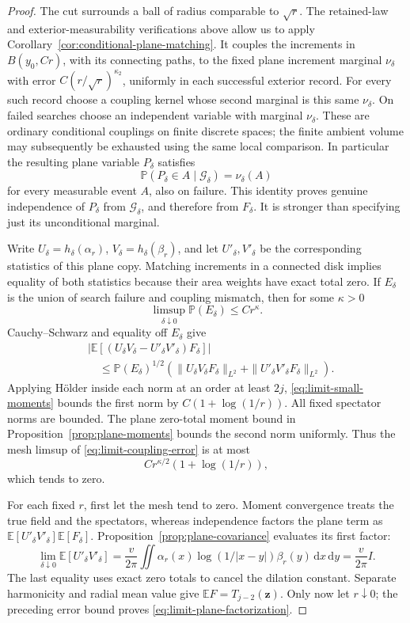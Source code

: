 \documentclass[11pt]{article}
\theoremstyle{definition}
\theoremstyle{remark}
\numberwithin{equation}{section}
\begin{document}
\begin{proof}
The cut surrounds a ball of radius comparable to \(\sqrt r\).
The retained-law and exterior-measurability verifications above allow
us to apply Corollary~\ref{cor:conditional-plane-matching}.  It couples
the increments
in \(B(y_0,Cr)\), with its connecting paths, to the fixed plane
increment marginal \(\nu_\delta\) with error
\(C(r/\sqrt r)^{\kappa_2}\), uniformly in each successful exterior
record.  For every such record choose a coupling kernel whose
second marginal is this same \(\nu_\delta\).  On failed searches
choose an independent variable with marginal \(\nu_\delta\).
These are ordinary conditional couplings on finite discrete
spaces; the finite ambient volume may subsequently be exhausted
using the same local comparison.  In particular the resulting
plane variable \(P_\delta\) satisfies
\[
     \mathbb P(P_\delta\in A\mid\mathcal G_\delta)=\nu_\delta(A)
\]
for every measurable event \(A\), also on failure.  This identity
proves genuine independence of \(P_\delta\) from
\(\mathcal G_\delta\), and therefore from \(F_\delta\).
It is stronger than specifying just its unconditional marginal.

Write \(U_\delta=h_\delta(\alpha_r)\),
\(V_\delta=h_\delta(\beta_r)\), and let \(U'_\delta,V'_\delta\)
be the corresponding statistics of this plane copy.
Matching increments in a connected disk implies equality of both
statistics because their area weights have exact total zero.
If \(E_\delta\) is the union of search failure and coupling mismatch,
then for some \(\kappa>0\)
\[
 \limsup_{\delta\downarrow0}\mathbb P(E_\delta)\le Cr^\kappa.
\]
Cauchy--Schwarz and equality off \(E_\delta\) give
\begin{align}
 &\left|\mathbb E[(U_\delta V_\delta-U'_\delta V'_\delta)F_\delta]\right|
 \nonumber\\
 &\quad\le
 \mathbb P(E_\delta)^{1/2}
 \left(\|U_\delta V_\delta F_\delta\|_{L^2}
               +\|U'_\delta V'_\delta F_\delta\|_{L^2}\right).
 \label{eq:limit-coupling-error}
\end{align}
Applying H\"older inside each norm at an order at least \(2j\),
\eqref{eq:limit-small-moments} bounds the first norm by
\(C(1+\log(1/r))\).  All fixed spectator norms are bounded.
The plane zero-total moment bound in
Proposition~\ref{prop:plane-moments} bounds the second norm uniformly.
Thus the mesh limsup of \eqref{eq:limit-coupling-error} is at most
\[
                  Cr^{\kappa/2}(1+\log(1/r)),
\]
which tends to zero.

For each fixed \(r\), first let the mesh tend to zero.
Moment convergence treats the true field and the spectators,
whereas independence factors the plane term as
\(\mathbb E[U'_\delta V'_\delta]\mathbb E[F_\delta]\).
Proposition~\ref{prop:plane-covariance} evaluates its first factor:
\[
 \lim_{\delta\downarrow0}\mathbb E[U'_\delta V'_\delta]
   =\frac{v}{2\pi}
       \iint\alpha_r(x)\log(1/|x-y|)\beta_r(y)\,\mathrm d x\,\mathrm d y
   =\frac{v}{2\pi}I.
\]
The last equality uses exact zero totals to cancel the dilation
constant.  Separate harmonicity and radial mean value give
\(\mathbb E F=T_{j-2}(\mathbf z)\).  Only now let \(r\downarrow0\);
the preceding error bound proves \eqref{eq:limit-plane-factorization}.


\end{proof}
\end{document}
